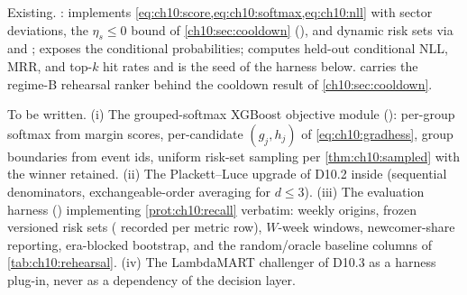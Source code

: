 \begin{codehooks}
Existing. : 
implements \cref{eq:ch10:score,eq:ch10:softmax,eq:ch10:nll} with sector
deviations, the $\eta_s \le 0$ bound of \cref{ch10:sec:cooldown}
(), and dynamic risk sets via
 and ;
 exposes the conditional probabilities;
 computes held-out conditional NLL, MRR, and
top-$k$ hit rates and is the seed of the harness below.
 carries the regime-B rehearsal ranker
behind the cooldown result of \cref{ch10:sec:cooldown}.

To be written. (i) The grouped-softmax XGBoost objective module
(): per-group softmax
from margin scores, per-candidate $(g_j, h_j)$ of
\cref{eq:ch10:gradhess}, group boundaries from event ids, uniform
risk-set sampling per \cref{thm:ch10:sampled} with the winner retained.
(ii) The Plackett--Luce upgrade of D10.2 inside
 (sequential denominators, exchangeable-order
averaging for $d \le 3$). (iii) The evaluation harness
() implementing \cref{prot:ch10:recall}
verbatim: weekly origins, frozen versioned risk sets
( recorded per metric row), $W$-week windows,
newcomer-share reporting, era-blocked bootstrap, and the
random/oracle baseline columns of \cref{tab:ch10:rehearsal}. (iv) The
LambdaMART challenger of D10.3 as a harness plug-in, never as a
dependency of the decision layer.
\end{codehooks}
